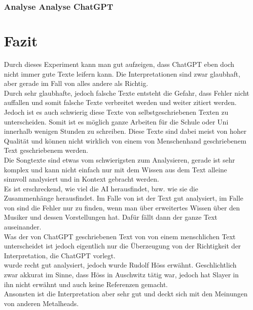 \documentclass[twocolumn,10pt]{article}
\begin{document}
		\subsubsection{Analyse Analyse ChatGPT}
			
		\vfill
		\clearpage
	\section{Fazit}
	Durch dieses Experiment kann man gut aufzeigen, dass ChatGPT\cite{ChatGPT} eben doch nicht immer gute Texte leifern kann. Die Interpretationen sind zwar glaubhaft, aber gerade im Fall von  alles andere als Richtig.\\
	Durch sehr glaubhafte, jedoch falsche Texte entsteht die Gefahr, dass Fehler nicht auffallen und somit falsche Texte verbreitet werden und weiter zitiert werden.\\	
	Jedoch ist es auch schwierig diese Texte von selbstgeschriebenen Texten zu unterscheiden. Somit ist es möglich ganze Arbeiten für die Schule oder Uni innerhalb wenigen Stunden zu schreiben. Diese Texte sind dabei meist von hoher Qualität und können nicht wirklich von einem von Menschenhand geschriebenem Text geschriebenem werden.\\	
	Die Songtexte sind etwas vom schwierigsten zum Analysieren, gerade  ist sehr komplex und kann nicht einfach nur mit dem Wissen aus dem Text alleine sinnvoll analysiert und in Kontext gebracht werden.\\	
	Es ist erschreckend, wie viel die AI herausfindet, bzw. wie sie die Zusammenhänge herausfindet. Im Falle von  ist der Text gut analysiert, im Falle von  sind die Fehler nur zu finden, wenn man über erweitertes Wissen über den Musiker und dessen Vorstellungen hat. Dafür fällt dann der ganze Text auseinander.\\	
	Was der von ChatGPT geschriebenen Text von  von einem menschlichen Text unterscheidet ist jedoch eigentlich nur die Überzeugung von der Richtigkeit der Interpretation, die ChatGPT vorlegt.\\
	 wurde recht gut analysiert, jedoch wurde Rudolf Höss erwähnt. Geschlichtlich zwar akkurat im Sinne, dass Höss in Auschwitz tätig war, jedoch hat Slayer in  ihn nicht erwähnt und auch keine Referenzen gemacht.\\
	Ansonsten ist die Interpretation aber sehr gut und deckt sich mit den Meinungen von anderen Metalheads.\\
	
\end{document}
